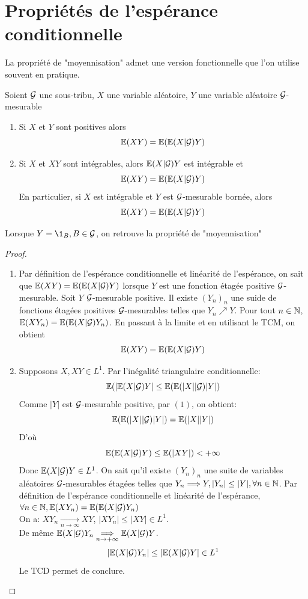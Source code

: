 \documentclass[]{report}
\begin{document}
    \section{Propriétés de l'espérance conditionnelle}

    La propriété de "moyennisation" admet une version fonctionnelle que l'on utilise souvent en pratique.

    \begin{prop}{}{}
        Soient $\mathcal{G}$ une sous-tribu, $X$ une variable aléatoire, $Y$ une variable aléatoire $\mathcal{G}$-mesurable
        \begin{enumerate}
            \item Si $X$ et $Y$ sont positives alors
            \[\mathbb{E}(XY)=\mathbb{E}(\mathbb{E}(X|\mathcal{G})Y)\]
            \item Si $X$ et $XY$ sont intégrables, alors $\mathbb{E}(X|\mathcal{G})Y$ est intégrable et
            \[\mathbb{E}(XY)=\mathbb{E}(\mathbb{E}(X|\mathcal{G})Y)\]
            En particulier, si $X$ est intégrable et $Y$ est $\mathcal{G}$-mesurable bornée, alors
            \[\mathbb{E}(XY)=\mathbb{E}(\mathbb{E}(X|\mathcal{G})Y)\]
        \end{enumerate}
    \end{prop}

    \begin{re}{}{}
        Lorsque $Y=\1_B,B\in \Gr$, on retrouve la propriété de "moyennisation"
    \end{re}

    \begin{proof}
        \begin{enumerate}
            \item Par définition de l'espérance conditionnelle et linéarité de l'espérance, on sait que $\mathbb{E}(XY)=\mathbb{E}(\mathbb{E}(X|\mathcal{G})Y)$ lorsque $Y$ est une fonction étagée positive $\mathcal{G}$-mesurable. Soit $Y$ $\mathcal{G}$-mesurable positive. Il existe $(Y_n)_n$ une suide de fonctions étagées positives $\mathcal{G}$-mesurables telles que $Y_n\nearrow Y$. Pour tout $n\in \mathbb{N}$, $\mathbb{E}(XY_n)=\mathbb{E}(\mathbb{E}(X|\mathcal{G})Y_n)$. En passant à la limite et en utilisant le TCM, on obtient
            \[\mathbb{E}(XY)=\mathbb{E}(\mathbb{E}(X|\mathcal{G})Y)\]
            \item Supposons $X,XY\in L^1$. Par l'inégalité triangulaire conditionnelle:
            \[\mathbb{E} (|\mathbb{E}(X|\mathcal{G})Y|\le \mathbb{E}(\mathbb{E}(|X||\mathcal{G})|Y|)\]
            Comme $|Y|$ est $\mathcal{G}$-mesurable positive, par $(1)$, on obtient:
            \[\mathbb{E}(\mathbb{E}(|X||\mathcal{G})|Y|)=\mathbb{E}(|X||Y|)\]
            D'où
            \[\mathbb{E}(\mathbb{E}(X|\mathcal{G})Y)\le \mathbb{E}(|XY|)<+\infty\]
            Donc $\mathbb{E}(X|\mathcal{G})Y\in L^1$. On sait qu'il existe $(Y_n)_n$ une suite de variables aléatoires $\mathcal{G}$-mesurables étagées telles que $Y_n\Longrightarrow Y, |Y_n|\le |Y|,\forall n\in \mathbb{N}$. Par définition de l'espérance conditionnelle et linéarité de l'espérance, $\forall n\in \mathbb{N}, \mathbb{E}(XY_n)=\mathbb{E}(\mathbb{E}(X|\mathcal{G}) Y_n)$\\
            On a: $XY_n\underset{n\to \infty}{\longrightarrow}XY$, $|XY_n|\le |XY|\in L^1$.\\
            De même $\mathbb{E}(X|\mathcal{G})Y_n\underset{n\to +\infty}{\Longrightarrow}\mathbb{E} (X|\mathcal{G})Y$.
            \[|\mathbb{E}(X|\mathcal{G})Y_n|\le |\mathbb{E}(X|\mathcal{G})Y|\in L^1\]
            Le TCD permet de conclure.
        \end{enumerate}
    \end{proof}
\end{document}
